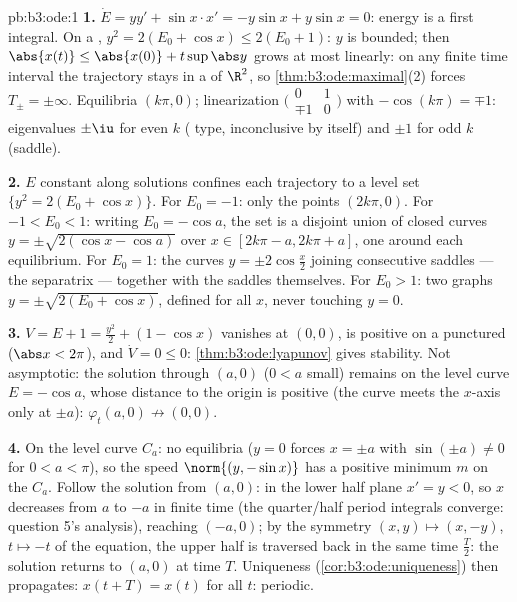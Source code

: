 \begin{solution}{pb:b3:ode:1}
\textbf{1.} $\dot E = yy' + \sin x\cdot x' = -y\sin x +
y\sin x = 0$: energy is a first integral. On a , $y^2 = 2(E_0 + \cos x) \leq 2(E_0 + 1)$: $y$ is
bounded; then $\abs{x(t)} \leq \abs{x(0)} +
t\sup\abs y$ grows at most linearly: on any finite time
interval the trajectory stays in a  of $\R^2$, so
\cref{thm:b3:ode:maximal}(2) forces $T_\pm = \pm\infty$.
Equilibria $(k\pi, 0)$; linearization
$\bigl(\begin{smallmatrix}0&1\\
\mp1&0\end{smallmatrix}\bigr)$ with $-\cos(k\pi) = \mp1$:
eigenvalues $\pm\iu$ for even $k$ ( type, inconclusive
by itself) and $\pm1$ for odd $k$ (saddle).

\textbf{2.} $E$ constant along solutions confines each
trajectory to a level set $\{y^2 = 2(E_0 + \cos x)\}$. For
$E_0 = -1$: only the points $(2k\pi, 0)$. For $-1 < E_0 <
1$: writing $E_0 = -\cos a$, the set is a disjoint union of
closed curves $y = \pm\sqrt{2(\cos x - \cos a)}$ over $x \in
[2k\pi - a, 2k\pi + a]$, one around each  equilibrium.
For $E_0 = 1$: the curves $y = \pm2\cos\frac x2$ joining
consecutive saddles --- the separatrix --- together with the
saddles themselves. For $E_0 > 1$: two graphs $y =
\pm\sqrt{2(E_0 + \cos x)}$, defined for all $x$, never
touching $y = 0$.

\textbf{3.} $V = E + 1 = \frac{y^2}2 + (1 - \cos x)$
vanishes at $(0,0)$, is positive on a punctured 
($\abs x < 2\pi$), and $\dot V = 0 \leq 0$:
\cref{thm:b3:ode:lyapunov} gives stability. Not asymptotic:
the solution through $(a, 0)$ ($0 < a$ small) remains on the
level curve $E = -\cos a$, whose distance to the origin is
positive (the curve meets the $x$-axis only at $\pm a$):
$\varphi_t(a, 0) \not\to (0,0)$.

\textbf{4.} On the level curve $C_a$: no equilibria ($y = 0$
forces $x = \pm a$ with $\sin(\pm a) \neq 0$ for $0 < a <
\pi$), so the speed $\norm{(y, -\sin x)}$ has a positive
minimum $m$ on the  $C_a$. Follow the solution from
$(a, 0)$: in the lower half plane $x' = y < 0$, so $x$
decreases from $a$ to $-a$ in finite time (the quarter/half
period integrals converge: question 5's analysis), reaching
$(-a, 0)$; by the symmetry $(x, y) \mapsto (x, -y)$, $t
\mapsto -t$ of the equation, the upper half is traversed
back in the same time $\frac T2$: the solution returns to
$(a, 0)$ at time $T$. Uniqueness
(\cref{cor:b3:ode:uniqueness}) then propagates: $x(t + T) =
x(t)$ for all $t$: periodic.


\end{solution}

